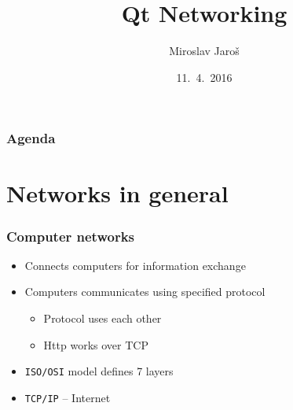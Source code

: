 \documentclass{beamer}
\title{Qt Networking}
\author{Miroslav Jaroš}
\institute[Pb173]{Pb173 Crypto}
\date{11.~4.~2016}
\begin{document}
    \begin{frame}
        \titlepage
    \end{frame}
    \begin{frame}
        \frametitle{Agenda}
        \tableofcontents
    \end{frame}

    \section{Networks in general}
    \begin{frame}
        \frametitle{Computer networks}
        \begin{itemize}
            \item Connects computers for information exchange
            \item Computers communicates using specified protocol
            \begin{itemize}
                \item Protocol uses each other
                \item Http works over TCP
            \end{itemize}
            \item \texttt{ISO/OSI} model defines 7 layers
            \item \texttt{TCP/IP} -- Internet
        \end{itemize}
    \end{frame}
\end{document}
